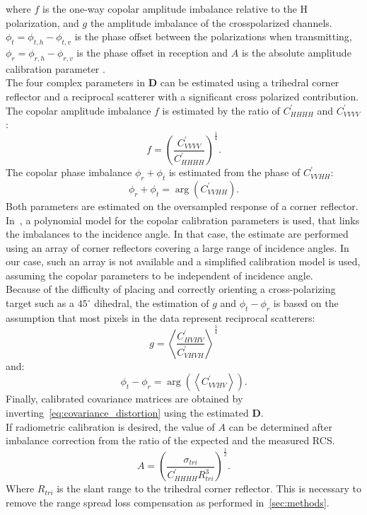 where $f$ is the one-way copolar amplitude imbalance relative to the H polarization, and $g$ the amplitude imbalance of the crosspolarized channels. $\phi_t = \phi_{t,h} -\phi_{t,v}$ is the phase offset between the polarizations when transmitting, $\phi_{r} = \phi_{r,h} -\phi_{r,v}$ is the phase offset in reception and $A$ is the absolute amplitude calibration parameter \cite{Ainsworth2006a, Fore2015}.\\
The four complex parameters in $\mathbf{D}$ can be estimated using a trihedral corner reflector and a reciprocal scatterer with a significant cross polarized contribution\cite{Sarabandi1990,Pipia2009}.\\
The  copolar amplitude imbalance $f$ is estimated by the ratio of $C_{HHHH}^\prime$ and $C_{VVVV}^\prime$:
\begin{equation}
	f = \left(\frac{C^{\prime}_{VVVV}}{C^{\prime}_{HHHH}}\right)^{\frac{1}{4}}.
\end{equation}
The copolar phase imbalance $\phi_r + \phi_t$ is estimated from the phase of $C_{VVHH}^{\prime}$:
\begin{equation}
	\phi_r + \phi_t = \operatorname{arg}\left(C_{VVHH}^\prime\right).
\end{equation}
Both parameters are estimated on the oversampled response of a corner reflector. In~\cite{Fore2015}, a polynomial model for the copolar calibration parameters is used, that links the imbalances to the incidence angle. In that case, the estimate are performed using an array of corner reflectors covering a large range of incidence angles. In our case, such an array is not available and a simplified calibration model is used, assuming the copolar parameters to be independent of incidence angle.\\ 
Because of the difficulty of placing and correctly orienting a cross-polarizing target such as a $45^\circ$ dihedral, the estimation of $g$ and $\phi_t - \phi_r$ is based on the assumption that most pixels in the data represent reciprocal scatterers:
\begin{equation}
	g = \left<\frac{C_{HVHV}^{\prime}}{C_{VHVH}^{\prime}}\right>^\frac{1}{4}
\end{equation}
and:
\begin{equation}
	\phi_t - \phi_r =\operatorname{arg}\left( \left<C_{VVHV}^{\prime}\right>\right).
\end{equation}
Finally, calibrated covariance matrices are obtained by inverting~\eqref{eq:covariance_distortion} using the estimated $\mathbf{D}$.\\
If radiometric calibration is desired, the value of $A$ can be determined after imbalance correction from the ratio of the expected and the measured RCS.
\begin{equation}
	A =	\left(\frac{\sigma_{tri}}{C^{\prime}_{HHHH} R_{tri}^{3}}\right)^\frac{1}{2}.
\end{equation}
Where $R_{tri}$ is the slant range to the trihedral corner reflector. This is necessary to remove the range spread loss compensation as performed in~\autoref{sec:methods}.

